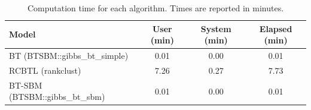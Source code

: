\begin{table}[!h]
\centering
\caption{Computation time for each algorithm. Times are reported in minutes.}
\centering
\begin{tabular}[t]{lccc}
\toprule
Model & User (min) & System (min) & Elapsed (min)\\
\midrule
BT (BTSBM::gibbs\_bt\_simple) & 0.01 & 0.00 & 0.01\\
RCBTL (rankclust) & 7.26 & 0.27 & 7.73\\
BT-SBM (BTSBM::gibbs\_bt\_sbm) & 0.01 & 0.00 & 0.01\\
\bottomrule
\end{tabular}
\end{table}